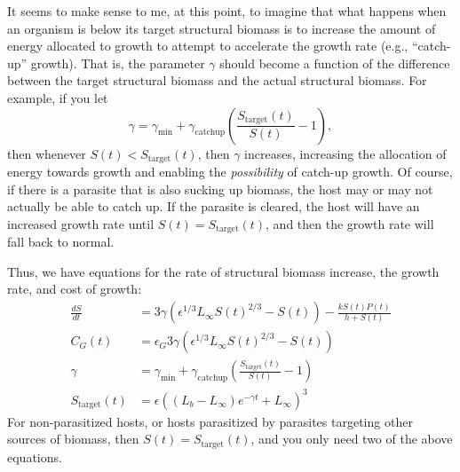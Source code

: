 \documentclass[11pt,reqno,final,pdftex]{amsart}\usepackage[]{graphicx}\usepackage[]{color}
\theoremstyle{plain}
\numberwithin{equation}{part}
\begin{document}
It seems to make sense to me, at this point, to imagine that what happens when an organism is below its target structural biomass is to increase the amount of energy allocated to growth to attempt to accelerate the growth rate (e.g., ``catch-up'' growth).
That is, the parameter $\gamma$ should become a function of the difference between the target structural biomass and the actual structural biomass.
For example, if you let
\begin{equation}
\gamma =\gamma _{\min }+\gamma _{\text{catchup}}\left(\frac{S_{\text{target}}(t)}{S(t)}-1\right),
\end{equation}
then whenever $S(t)<S_{\text{target}}(t)$, then $\gamma$ increases, increasing the allocation of energy towards growth and enabling the \textit{possibility} of catch-up growth.
Of course, if there is a parasite that is also sucking up biomass, the host may or may not actually be able to catch up.
If the parasite is cleared, the host will have an increased growth rate until $S(t)=S_{\text{target}}(t)$, and then the growth rate will fall back to normal.

Thus, we have equations for the rate of structural biomass increase, the growth rate, and cost of growth:
\begin{align}
\frac{dS}{dt} &= 3\gamma  \left(\epsilon ^{1/3}L_{\infty }S(t)^{2/3}-S(t)\right)-\frac{k S(t) P(t)}{h+S(t)} \\
C_G(t)&=\epsilon _G 3\gamma  \left(\epsilon ^{1/3}L_{\infty }S(t)^{2/3}-S(t)\right) \\
\gamma &=\gamma _{\min }+\gamma _{\text{catchup}}\left(\frac{S_{\text{target}}(t)}{S(t)}-1\right) \\
S_{\text{target}}(t) &=\epsilon  \left(\left(L_b-L_{\infty }\right) e^{-\gamma  t}+L_{\infty }\right)^3
\end{align}
For non-parasitized hosts, or hosts parasitized by parasites targeting other sources of biomass, then $S(t)=S_{\text{target}}(t)$, and you only need two of the above equations.
\end{document}
